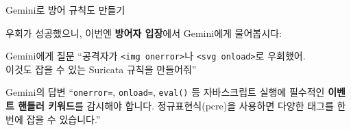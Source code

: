 \documentclass[aspectratio=169,10pt]{beamer}
\newcommand{\blue}[1]{\textcolor{blueTeam}{\textbf{#1}}}
\begin{document}
\begin{frame}[shrink=3]{Gemini로 방어 규칙도 만들기}

우회가 성공했으니, 이번엔 \blue{방어자 입장}에서 Gemini에게 물어봅시다:

\vspace{0.3em}
\begin{block}{Gemini에게 질문}
``공격자가 \texttt{<img onerror>}나 \texttt{<svg onload>}로 우회했어.\\
이것도 잡을 수 있는 Suricata 규칙을 만들어줘''
\end{block}

\vspace{0.2em}
\begin{block}{Gemini의 답변}
{\scriptsize
``\texttt{onerror=}, \texttt{onload=}, \texttt{eval()} 등 자바스크립트 실행에 필수적인 \textbf{이벤트 핸들러 키워드}를 감시해야 합니다. 정규표현식(pcre)을 사용하면 다양한 태그를 한 번에 잡을 수 있습니다.''}
\end{block}


\end{frame}
\end{document}
